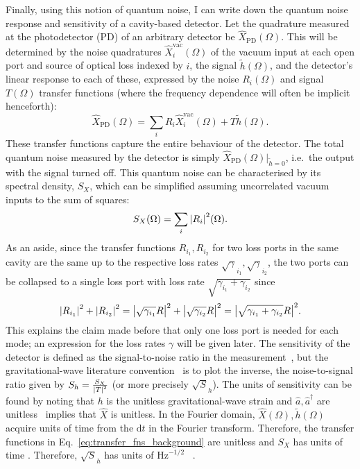 Finally, using this notion of quantum noise, I can write down the quantum noise response and sensitivity of a cavity-based detector. %
Let the quadrature measured at the photodetector (PD) of an arbitrary detector be $\hat{X}_\text{PD}(\Omega)$. This will be determined by the noise quadratures $\hat{X}_i^\text{vac}(\Omega)$ of the vacuum input at each open port and source of optical loss indexed by $i$, the signal $\tilde{h}(\Omega)$, and the detector's linear response to each of these, expressed by the noise $R_i(\Omega)$ and signal $T(\Omega)$ transfer functions (where the frequency dependence will often be implicit henceforth): \begin{equation}\label{eq:transfer_fns_background}\hat X_\text{PD}(\Omega)=\sum_i R_i \hat X_i^\text{vac}(\Omega) + T \tilde h(\Omega).\end{equation}
These transfer functions capture the entire behaviour of the detector. %
The total quantum noise measured by the detector is simply $\hat X_\text{PD}(\Omega)|_{\tilde h=0}$, i.e.\ the output with the signal turned off. This quantum noise can be characterised by its spectral density, $S_X$, which can be simplified assuming uncorrelated vacuum inputs to the sum of squares: \begin{equation}S_X(\Omega)=\sum_i \abs{R_i}^2(\Omega).\end{equation} 
As an aside, since the transfer functions $R_{i_1}, R_{i_2}$ for two loss ports in the same cavity are the same up to the respective loss rates $\sqrt\gamma_{i_1}, \sqrt\gamma_{i_2}$, the two ports can be collapsed to a single loss port with loss rate $\sqrt{\gamma_{i_1}+\gamma_{i_2}}$ since \begin{equation}\abs{R_{i_1}}^2+\abs{R_{i_2}}^2=\abs{\sqrt{\gamma_{i_1}}R}^2+\abs{\sqrt{\gamma_{i_2}}R}^2=\abs{\sqrt{\gamma_{i_1}+\gamma_{i_2}}R}^2.\end{equation} This explains the claim made before that only one loss port is needed for each mode; an expression for the loss rates $\gamma$ will be given later. 
The sensitivity of the detector is defined as the signal-to-noise ratio in the measurement~\cite{}, but the gravitational-wave literature convention~\cite{} is to plot the inverse, the noise-to-signal ratio given by $S_h = \frac{S_X}{\abs{T}^2}$ (or more precisely $\sqrt S_h$). The units of sensitivity can be found by noting that $h$ is the unitless gravitational-wave strain and $\hat a, \hat a^\dag$ are unitless~\cite{} implies that $\hat X$ is unitless. In the Fourier domain, $\hat X(\Omega), \tilde h(\Omega)$ acquire units of time from the $\text{d}t$ in the Fourier transform. Therefore, the transfer functions in Eq.~\ref{eq:transfer_fns_background} are unitless and $S_X$ has units of time . Therefore, $\sqrt S_h$ has units of $\text{Hz}^{-1/2}$~\cite{} . 
